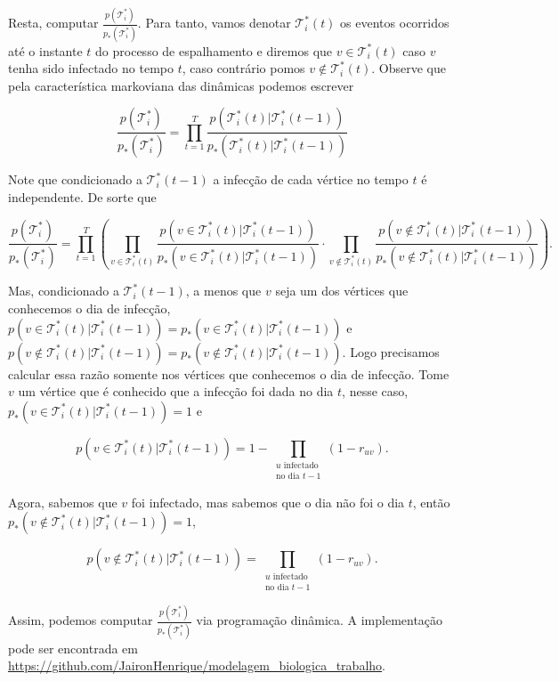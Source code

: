\documentclass{article}
\begin{document}
Resta, computar $\frac{p(\mathcal{T}^*_i)}{p_*(\mathcal{T}^*_i)}$. Para tanto, vamos denotar $\mathcal{T}_i^*(t)$ os eventos ocorridos até o instante $t$ do processo de espalhamento e diremos que $v \in \mathcal{T}_i^*(t)$ caso $v$ tenha sido infectado no tempo $t$, caso contrário pomos $v \not\in \mathcal{T}_i^*(t)$. Observe que pela característica markoviana das dinâmicas podemos escrever

\[\frac{p(\mathcal{T}^*_i)}{p_*(\mathcal{T}^*_i)} = \prod_{t = 1}^T \frac{p(\mathcal{T}_i^*(t)|\mathcal{T}_i^*(t-1))}{p_*(\mathcal{T}_i^*(t)|\mathcal{T}_i^*(t-1))}\]

Note que condicionado a $\mathcal{T}_i^*(t-1)$ a infecção de cada vértice no tempo $t$ é independente. De sorte que 

\[\frac{p(\mathcal{T}^*_i)}{p_*(\mathcal{T}^*_i)} = \prod_{t = 1}^T \left( \prod_{v \in \mathcal{T}_i^*(t)} \frac{p(v \in \mathcal{T}_i^*(t)|\mathcal{T}_i^*(t-1))}{p_*(v \in \mathcal{T}_i^*(t)|\mathcal{T}_i^*(t-1))} \cdot \prod_{v \not \in \mathcal{T}_i^*(t)} \frac{p(v \not \in \mathcal{T}_i^*(t)|\mathcal{T}_i^*(t-1))}{p_*(v \not \in \mathcal{T}_i^*(t)|\mathcal{T}_i^*(t-1))}  \right). \]

Mas, condicionado a $\mathcal{T}_i^*(t-1)$, a menos que $v$ seja um dos vértices que conhecemos o dia de infecção, $p(v \in \mathcal{T}_i^*(t)|\mathcal{T}_i^*(t-1)) = p_*(v \in \mathcal{T}_i^*(t)|\mathcal{T}_i^*(t-1))$ e $p(v \not \in \mathcal{T}_i^*(t)|\mathcal{T}_i^*(t-1)) = p_*(v \not \in \mathcal{T}_i^*(t)|\mathcal{T}_i^*(t-1))$. Logo precisamos calcular essa razão somente nos vértices que conhecemos o dia de infecção. Tome $v$ um vértice que é conhecido que a infecção foi dada no dia $t$, nesse caso, $p_*(v \in \mathcal{T}_i^*(t)|\mathcal{T}_i^*(t-1)) = 1$ e 

\[p(v \in \mathcal{T}_i^*(t)|\mathcal{T}_i^*(t-1)) = 1 - \prod_{\substack{u \textrm{ infectado}  \\ \textrm{no dia } t-1}} (1 - r_{uv}).\]

Agora, sabemos que $v$ foi infectado, mas sabemos que o dia não foi o dia $t$, então $p_*(v \not \in \mathcal{T}_i^*(t)|\mathcal{T}_i^*(t-1)) = 1$,

\[p(v \not \in \mathcal{T}_i^*(t)|\mathcal{T}_i^*(t-1)) = \prod_{\substack{u \textrm{ infectado}  \\ \textrm{no dia } t-1}} (1 - r_{uv}).\]

Assim, podemos computar $\frac{p(\mathcal{T}^*_i)}{p_*(\mathcal{T}^*_i)}$ via programação dinâmica. A implementação pode ser encontrada em \url{https://github.com/JaironHenrique/modelagem_biologica_trabalho}.
\end{document}
